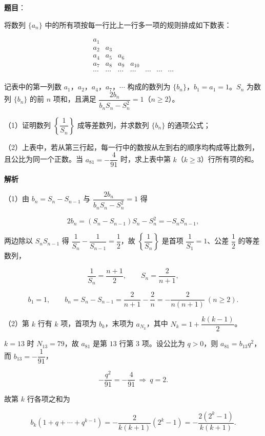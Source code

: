 \begin{answer}

\textbf{题目}：

将数列 $\{a_n\}$ 中的所有项按每一行比上一行多一项的规则排成如下数表：

\nopagebreak[4]
\[\begin{array}{ccccccc}
a_1&&&&&&\\
a_2&a_3&&&&&\\
a_4&a_5&a_6&&&&\\
a_7&a_8&a_9&a_{10}&&&\\
\cdots&\cdots&\cdots&\cdots&\cdots&\cdots&\cdots
\end{array}\]

记表中的第一列数 $a_1$，$a_2$，$a_4$，$a_7$，$\cdots$ 构成的数列为 $\{b_n\}$，$b_1=a_1=1$。$S_n$ 为数列 $\{b_n\}$ 的前 $n$ 项和，且满足 $\dfrac{2b_n}{b_nS_n-S_n^2}=1$（$n\geqslant2$）。

（1）证明数列 $\left\{\dfrac1{S_n}\right\}$ 成等差数列，并求数列 $\{b_n\}$ 的通项公式；

（2）上表中，若从第三行起，每一行中的数按从左到右的顺序均构成等比数列，且公比为同一个正数。当 $a_{81}=-\dfrac4{91}$ 时，求上表中第 $k$（$k\geqslant3$）行所有项的和。

\textbf{解析}

（1）由 $b_n=S_n-S_{n-1}$ 与 $\dfrac{2b_n}{b_nS_n-S_n^2}=1$ 得

\nopagebreak[4]
\[2b_n=(S_n-S_{n-1})S_n-S_n^2=-S_nS_{n-1},\]

两边除以 $S_nS_{n-1}$ 得 $\dfrac1{S_n}-\dfrac1{S_{n-1}}=\dfrac12$，故 $\left\{\dfrac1{S_n}\right\}$ 是首项 $\dfrac1{S_1}=1$、公差 $\dfrac12$ 的等差数列，

\nopagebreak[4]
\[\frac1{S_n}=\frac{n+1}2,\qquad S_n=\frac2{n+1},\]

\nopagebreak[4]
\[b_1=1,\qquad b_n=S_n-S_{n-1}=\frac2{n+1}-\frac2n=-\frac2{n(n+1)}\ (n\geqslant2).\]

（2）第 $k$ 行有 $k$ 项，首项为 $b_k$，末项为 $a_{N_k}$，其中 $N_k=1+\dfrac{k(k-1)}2$。

$k=13$ 时 $N_{13}=79$，故 $a_{81}$ 是第 $13$ 行第 $3$ 项。设公比为 $q>0$，则 $a_{81}=b_{13}q^2$，而 $b_{13}=-\dfrac1{91}$，

\nopagebreak[4]
\[-\frac{q^2}{91}=-\frac4{91}\ \Longrightarrow\ q=2.\]

故第 $k$ 行各项之和为

\nopagebreak[4]
\[b_k\left(1+q+\cdots+q^{k-1}\right)=-\frac{2}{k(k+1)}\left(2^k-1\right)=-\frac{2(2^k-1)}{k(k+1)}.\]


\end{answer}
